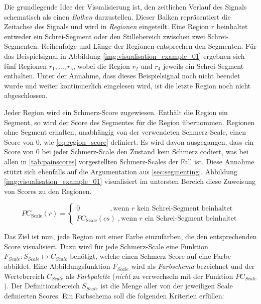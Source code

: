 Die grundlegende Idee der Visualisierung ist, den zeitlichen Verlauf des Signals schematisch als einen \emph{Balken} darzustellen. Dieser Balken repräsentiert die Zeitachse des Signals und wird in \emph{Regionen} eingeteilt. Eine Region $r$ beinhaltet entweder ein Schrei-Segment oder den Stillebereich zwischen zwei Schrei-Segmenten. Reihenfolge und Länge der Regionen entsprechen den Segmenten. Für das Beispielsignal in Abbildung \ref{img:visualisation_example_01} ergebnen sich fünf Regionen $r_{1} , \ldots , r_5 $, wobei die Region $r_2$ und $r_4$ jeweils ein Schrei-Segment enthalten. Unter der Annahme, dass dieses Beispielsignal noch nicht beendet wurde und weiter kontinuierlich eingelesen wird, ist die letzte Region noch nicht abgeschlossen.

Jeder Region wird ein Schmerz-Score zugewiesen. Enthält die Region ein Segment, so wird der Score des Segmentes für die Region übernommen. Regionen ohne Segment erhalten, unabhängig von der verwendeten Schmerz-Scale, einen Score von 0, wie \autoref{eq:region_score} definiert. Es wird davon ausgegangen, dass ein Score von 0 bei jeder Schmerz-Scale den Zustand \glqq kein Schmerz\grqq{} codiert, was bei allen in \autoref{tab:painscores} vorgestellten Schmerz-Scales der Fall ist. Diese Annahme stützt sich ebenfalls auf die Argumentation aus \autoref{sec:segmenting}. Abbildung \ref{img:visualisation_example_01} visualisiert im untersten Bereich diese Zuweisung von Scores zu den Regionen.

\begin{equation}
PC_{\text{Scale}}(r) = \begin{cases}
 0 \qquad \qquad \;,  \text{wenn } r  \text{ kein Schrei-Segment beinhaltet} \\
 PC_{\text{Scale}}(cs) \;, \text{wenn } r  \text{ ein Schrei-Segment beinhaltet}
 \end{cases}	
 \label{eq:region_score}
\end{equation}

Das Ziel ist nun, jede Region mit einer Farbe einzufärben, die den entsprechenden Score visualisiert. Dazu wird für jede Schmerz-Scale eine Funktion $F_{Scale}:S_{Scale} \mapsto C_{Scale}$ benötigt, welche einen Schmerz-Score auf eine Farbe abbildet. Eine Abbildungsfunktion $F_{Scale}$ wird als \emph{Farbschema} bezeichnet und der Wertebereich $C_{Scale}$ als \emph{Farbpalette} (\emph{nicht} zu verwechseln mit der Funktion $PC_{Scale}$). Der Definitionsbereich $S_{Scale}$ ist die Menge aller von der jeweiligen Scale definierten Scores. Ein Farbschema soll die folgenden Kriterien erfüllen:

